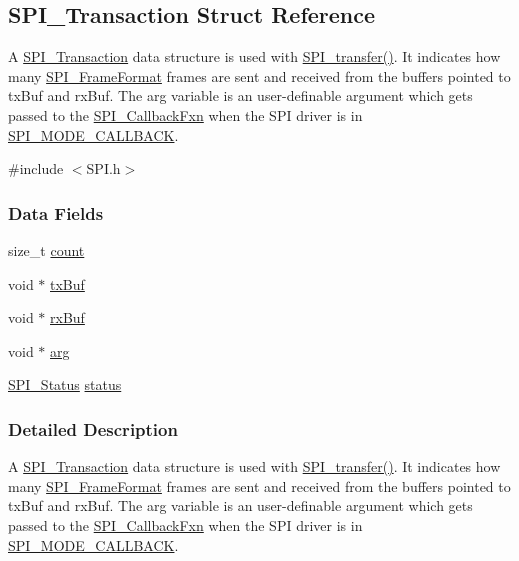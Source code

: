 \subsection{S\-P\-I\-\_\-\-Transaction Struct Reference}
\label{struct_s_p_i___transaction}


A \hyperlink{struct_s_p_i___transaction}{S\-P\-I\-\_\-\-Transaction} data structure is used with \hyperlink{_s_p_i_8h_a989e17f96b54fcc3dc2cac5f8ac6bdb2}{S\-P\-I\-\_\-transfer()}. It indicates how many \hyperlink{_s_p_i_8h_a53949638d43ae7bf71b74c2b136ad206}{S\-P\-I\-\_\-\-Frame\-Format} frames are sent and received from the buffers pointed to tx\-Buf and rx\-Buf. The arg variable is an user-\/definable argument which gets passed to the \hyperlink{_s_p_i_8h_aeb03e7608a14021c3b0acf92c90e2168}{S\-P\-I\-\_\-\-Callback\-Fxn} when the S\-P\-I driver is in \hyperlink{_s_p_i_8h_ab9ea76c6529d6076eee5e1c4a5a92c6fa5631e69925c47a62a261c78ebbda39fb}{S\-P\-I\-\_\-\-M\-O\-D\-E\-\_\-\-C\-A\-L\-L\-B\-A\-C\-K}.  




{\ttfamily \#include $<$S\-P\-I.\-h$>$}

\subsubsection*{Data Fields}
\begin{DoxyCompactItemize}
\item 
size\-\_\-t \hyperlink{struct_s_p_i___transaction_ad049d6a900c4bdb59a5ee8ce3d5bced2}{count}
\item 
void $\ast$ \hyperlink{struct_s_p_i___transaction_a9461a248f1cceb4048668d44b323a0b8}{tx\-Buf}
\item 
void $\ast$ \hyperlink{struct_s_p_i___transaction_a214f57d7809c875fb9456a62a406e041}{rx\-Buf}
\item 
void $\ast$ \hyperlink{struct_s_p_i___transaction_ac47daaa10705d748ace918a098aa1945}{arg}
\item 
\hyperlink{_s_p_i_8h_a913c57c335166de9caa54b7eb9ad95fb}{S\-P\-I\-\_\-\-Status} \hyperlink{struct_s_p_i___transaction_aa244504b2384411f7de17340be62128a}{status}
\end{DoxyCompactItemize}


\subsubsection{Detailed Description}
A \hyperlink{struct_s_p_i___transaction}{S\-P\-I\-\_\-\-Transaction} data structure is used with \hyperlink{_s_p_i_8h_a989e17f96b54fcc3dc2cac5f8ac6bdb2}{S\-P\-I\-\_\-transfer()}. It indicates how many \hyperlink{_s_p_i_8h_a53949638d43ae7bf71b74c2b136ad206}{S\-P\-I\-\_\-\-Frame\-Format} frames are sent and received from the buffers pointed to tx\-Buf and rx\-Buf. The arg variable is an user-\/definable argument which gets passed to the \hyperlink{_s_p_i_8h_aeb03e7608a14021c3b0acf92c90e2168}{S\-P\-I\-\_\-\-Callback\-Fxn} when the S\-P\-I driver is in \hyperlink{_s_p_i_8h_ab9ea76c6529d6076eee5e1c4a5a92c6fa5631e69925c47a62a261c78ebbda39fb}{S\-P\-I\-\_\-\-M\-O\-D\-E\-\_\-\-C\-A\-L\-L\-B\-A\-C\-K}. 


